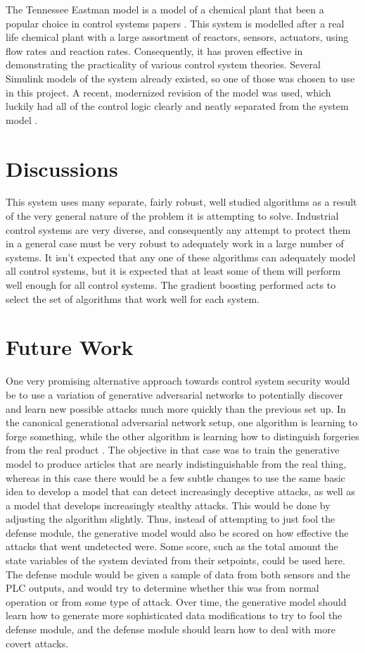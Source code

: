 \documentclass[10pt,twocolumn]{IEEEtran}
\begin{document}
The Tennessee Eastman model is a model of a chemical plant that been a popular choice in control systems papers \cite{te0,te1,te2,te3,te4}.
This system is modelled after a real life chemical plant with a large assortment of reactors, sensors, actuators, using flow rates and reaction rates.
Consequently, it has proven effective in demonstrating the practicality of various control system theories.
Several Simulink models of the system already existed, so one of those was chosen to use in this project.
A recent, modernized revision of the model was used, which luckily had all of the control logic clearly and neatly separated from the system model \cite{te_revised}.

\section{Discussions}\label{sec:discussion}
This system uses many separate, fairly robust, well studied algorithms as a result of the very general nature of the problem it is attempting to solve.
Industrial control systems are very diverse, and consequently any attempt to protect them in a general case must be very robust to adequately work in a large number of systems.
It isn't expected that any one of these algorithms can adequately model all control systems, but it is expected that at least some of them will perform well enough for all control systems.
The gradient boosting performed acts to select the set of algorithms that work well for each system.

\section{Future Work}\label{sec:future}
One very promising alternative approach towards control system security would be to use a variation of generative adversarial networks to potentially discover and learn new possible attacks much more quickly than the previous set up.
In the canonical generational adversarial network setup, one algorithm is learning to forge something, while the other algorithm is learning how to distinguish forgeries from the real product \cite{gan}.
The objective in that case was to train the generative model to produce articles that are nearly indistinguishable from the real thing, whereas in this case there would be a few subtle changes to use the same basic idea to develop a model that can detect increasingly deceptive attacks, as well as a model that develops increasingly stealthy attacks.
This would be done by adjusting the algorithm slightly.
Thus, instead of attempting to just fool the defense module, the generative model would also be scored on how effective the attacks that went undetected were.
Some score, such as the total amount the state variables of the system deviated from their setpoints, could be used here.
The defense module would be given a sample of data from both sensors and the PLC outputs, and would try to determine whether this was from normal operation or from some type of attack.
Over time, the generative model should learn how to generate more sophisticated data modifications to try to fool the defense module, and the defense module should learn how to deal with more covert attacks.
\end{document}

